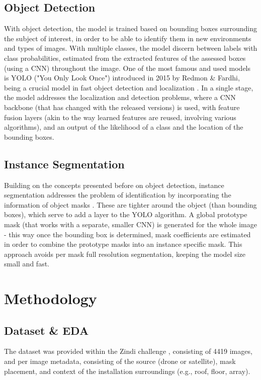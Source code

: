 \documentclass[conference]{IEEEtran}
\begin{document}
\subsection{Object Detection}

With object detection, the model is trained based on bounding boxes surrounding the subject of interest, in order to be able to identify them in new environments and types of images. With multiple classes, the model discern between labels with class probabilities, estimated from the extracted features of the assessed boxes (using a CNN) throughout the image. One of the most famous and used models is YOLO ("You Only Look Once") introduced in 2015 by Redmon \& Fardhi, being a crucial model in fast object detection and localization \cite{YOLO}. In a single stage, the model addresses the localization and detection problems, where a CNN backbone (that has changed with the released versions) is used, with feature fusion layers (akin to the way learned features are reused, involving various algorithms), and an output of the likelihood of a class and the location of the bounding boxes.

\subsection{Instance Segmentation}

Building on the concepts presented before on object detection, instance segmentation addresses the problem of identification by incorporating the information of object masks \cite{YOLOSeg}. These are tighter around the object (than bounding boxes), which serve to add a layer to the YOLO algorithm. A global prototype mask (that works with a separate, smaller CNN) is generated for the whole image - this way once the bounding box is determined, mask coefficients are estimated in order to combine the prototype masks into an instance specific mask. This approach avoids per mask full resolution segmentation, keeping the model size small and fast.



\section{Methodology}

\subsection{Dataset \& EDA}

The dataset was provided within the Zindi challenge \cite{zindi2025lacuna}, consisting of 4419 images, and per image metadata, consisting of the source (drone or satellite), mask placement, and context of the installation surroundings (e.g., roof, floor, array).
\end{document}
